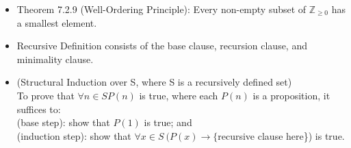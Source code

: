 \documentclass{article}
\begin{document}
\begin{itemize}
    \item Theorem 7.2.9 (Well-Ordering Principle): Every non-empty subset of $\mathbb{Z}_{\geqslant 0}$ has a smallest element.
    \item Recursive Definition consists of the base clause, recursion clause, and minimality clause.
    \item (Structural Induction over S, where S is a recursively defined set)
        \\ To prove that $\forall n\in S P(n)$ is true, where each $P(n)$ is a proposition, it suffices to:
        \\ \hspace*{3mm} (base step): show that $P(1)$ is true; and
        \\ \hspace*{3mm} (induction step): show that $\forall x\in S\ (P(x)\xrightarrow{} \{$recursive clause here\}) is true.  
\end{itemize}

\end{document}

